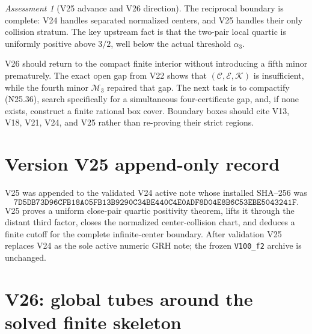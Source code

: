 \documentclass[11pt]{article}
\theoremstyle{definition}
\theoremstyle{remark}
\newtheorem{assessment}[theorem]{Assessment}
\begin{document}
\begin{assessment}[V25 advance and V26 direction]
\label{ass:f2v25}
The reciprocal boundary is complete: V24 handles separated normalized
centers, and V25 handles their only collision stratum.  The key upstream
fact is that the two-pair local quartic is uniformly positive above
\(3/2\), well below the actual threshold \(\alpha_3\).

V26 should return to the compact finite interior without introducing a
fifth minor prematurely.  The exact open gap from V22 shows that
\((\mathcal C,\mathcal E,\mathcal K)\) is insufficient, while the
fourth minor \(\mathcal M_3\) repaired that gap.  The next task is to
compactify \textup{(N25.36)}, search specifically for a simultaneous
four-certificate gap, and, if none exists, construct a finite rational
box cover.  Boundary boxes should cite V13, V18, V21, V24, and V25 rather
than re-proving their strict regions.
\end{assessment}

\section*{Version V25 append-only record}

V25 was appended to the validated V24 active note whose installed
SHA--256 was
\[
 \texttt{7D5DB73D96CFB18A05FB13B9290C34BE440C4E0ADF8D04E8B6C53EBE5043241F}.
 \tag{N25.37}
\]
V25 proves a uniform close-pair quartic positivity theorem, lifts it
through the distant third factor, closes the normalized center-collision
chart, and deduces a finite cutoff for the complete infinite-center
boundary.  After validation V25 replaces V24 as the sole active numeric
GRH note; the frozen \texttt{V100\_f2} archive is unchanged.



\section{V26: global tubes around the solved finite skeleton}
\label{sec:f2v26-skeleton}
\end{document}
